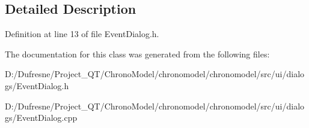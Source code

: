 \subsection{Detailed Description}


Definition at line 13 of file Event\-Dialog.\-h.



The documentation for this class was generated from the following files\-:\begin{DoxyCompactItemize}
\item 
D\-:/\-Dufresne/\-Project\-\_\-\-Q\-T/\-Chrono\-Model/chronomodel/chronomodel/src/ui/dialogs/Event\-Dialog.\-h\item 
D\-:/\-Dufresne/\-Project\-\_\-\-Q\-T/\-Chrono\-Model/chronomodel/chronomodel/src/ui/dialogs/Event\-Dialog.\-cpp\end{DoxyCompactItemize}
